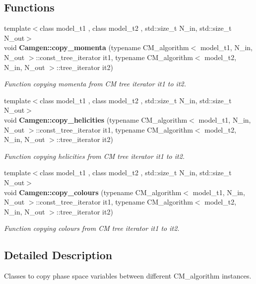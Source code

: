 \subsection*{Functions}
\begin{DoxyCompactItemize}
\item 
\hypertarget{a00878_a522b510143ac9bb66e5753230cc4d3dc}{}{\footnotesize template$<$class model\+\_\+t1 , class model\+\_\+t2 , std\+::size\+\_\+t N\+\_\+in, std\+::size\+\_\+t N\+\_\+out$>$ }\\void {\bfseries Camgen\+::copy\+\_\+momenta} (typename C\+M\+\_\+algorithm$<$ model\+\_\+t1, N\+\_\+in, N\+\_\+out $>$\+::const\+\_\+tree\+\_\+iterator it1, typename C\+M\+\_\+algorithm$<$ model\+\_\+t2, N\+\_\+in, N\+\_\+out $>$\+::tree\+\_\+iterator it2)\label{a00878_a522b510143ac9bb66e5753230cc4d3dc}

\begin{DoxyCompactList}\small\item\em Function copying momenta from C\+M tree iterator it1 to it2. \end{DoxyCompactList}\item 
\hypertarget{a00878_aa43e4ace819645b13d07004eb48d5dca}{}{\footnotesize template$<$class model\+\_\+t1 , class model\+\_\+t2 , std\+::size\+\_\+t N\+\_\+in, std\+::size\+\_\+t N\+\_\+out$>$ }\\void {\bfseries Camgen\+::copy\+\_\+helicities} (typename C\+M\+\_\+algorithm$<$ model\+\_\+t1, N\+\_\+in, N\+\_\+out $>$\+::const\+\_\+tree\+\_\+iterator it1, typename C\+M\+\_\+algorithm$<$ model\+\_\+t2, N\+\_\+in, N\+\_\+out $>$\+::tree\+\_\+iterator it2)\label{a00878_aa43e4ace819645b13d07004eb48d5dca}

\begin{DoxyCompactList}\small\item\em Function copying helicities from C\+M tree iterator it1 to it2. \end{DoxyCompactList}\item 
\hypertarget{a00878_a0417f9f7f76609cfe09278c293269270}{}{\footnotesize template$<$class model\+\_\+t1 , class model\+\_\+t2 , std\+::size\+\_\+t N\+\_\+in, std\+::size\+\_\+t N\+\_\+out$>$ }\\void {\bfseries Camgen\+::copy\+\_\+colours} (typename C\+M\+\_\+algorithm$<$ model\+\_\+t1, N\+\_\+in, N\+\_\+out $>$\+::const\+\_\+tree\+\_\+iterator it1, typename C\+M\+\_\+algorithm$<$ model\+\_\+t2, N\+\_\+in, N\+\_\+out $>$\+::tree\+\_\+iterator it2)\label{a00878_a0417f9f7f76609cfe09278c293269270}

\begin{DoxyCompactList}\small\item\em Function copying colours from C\+M tree iterator it1 to it2. \end{DoxyCompactList}\end{DoxyCompactItemize}


\subsection{Detailed Description}
Classes to copy phase space variables between different C\+M\+\_\+algorithm instances. 


